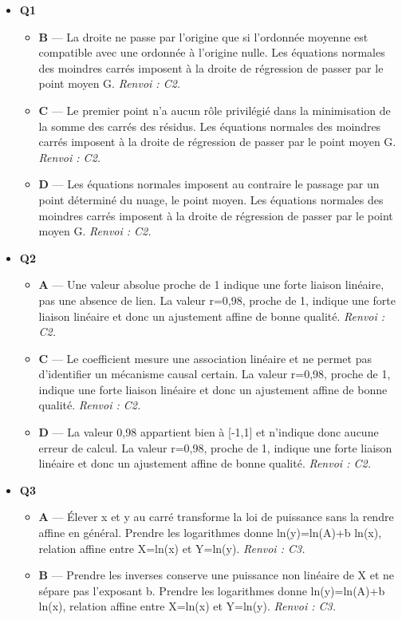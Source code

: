 \begin{itemize}
  \item \textbf{Q1}
  \begin{itemize}
    \item \textbf{B} — La droite ne passe par l'origine que si l'ordonnée moyenne est compatible avec une ordonnée à l'origine nulle. Les équations normales des moindres carrés imposent à la droite de régression de passer par le point moyen G. \emph{Renvoi : C2.}
    \item \textbf{C} — Le premier point n'a aucun rôle privilégié dans la minimisation de la somme des carrés des résidus. Les équations normales des moindres carrés imposent à la droite de régression de passer par le point moyen G. \emph{Renvoi : C2.}
    \item \textbf{D} — Les équations normales imposent au contraire le passage par un point déterminé du nuage, le point moyen. Les équations normales des moindres carrés imposent à la droite de régression de passer par le point moyen G. \emph{Renvoi : C2.}
  \end{itemize}
  \item \textbf{Q2}
  \begin{itemize}
    \item \textbf{A} — Une valeur absolue proche de 1 indique une forte liaison linéaire, pas une absence de lien. La valeur r=0,98, proche de 1, indique une forte liaison linéaire et donc un ajustement affine de bonne qualité. \emph{Renvoi : C2.}
    \item \textbf{C} — Le coefficient mesure une association linéaire et ne permet pas d'identifier un mécanisme causal certain. La valeur r=0,98, proche de 1, indique une forte liaison linéaire et donc un ajustement affine de bonne qualité. \emph{Renvoi : C2.}
    \item \textbf{D} — La valeur 0,98 appartient bien à [-1,1] et n'indique donc aucune erreur de calcul. La valeur r=0,98, proche de 1, indique une forte liaison linéaire et donc un ajustement affine de bonne qualité. \emph{Renvoi : C2.}
  \end{itemize}
  \item \textbf{Q3}
  \begin{itemize}
    \item \textbf{A} — Élever x et y au carré transforme la loi de puissance sans la rendre affine en général. Prendre les logarithmes donne ln(y)=ln(A)+b ln(x), relation affine entre X=ln(x) et Y=ln(y). \emph{Renvoi : C3.}
    \item \textbf{B} — Prendre les inverses conserve une puissance non linéaire de X et ne sépare pas l'exposant b. Prendre les logarithmes donne ln(y)=ln(A)+b ln(x), relation affine entre X=ln(x) et Y=ln(y). \emph{Renvoi : C3.}

\end{itemize}
\end{itemize}
